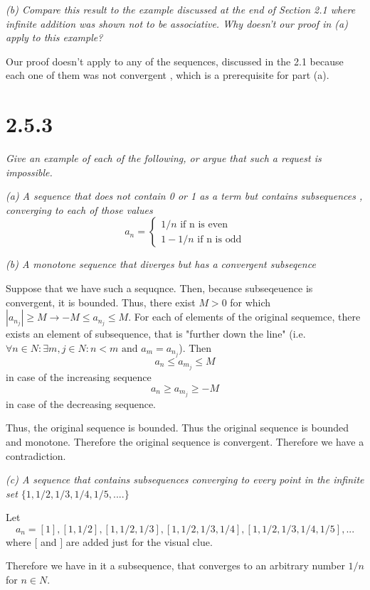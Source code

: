 \documentclass[11pt,oneside,titlepage]{article}
\begin{document}
\textit{(b) Compare this result to the example discussed at the end of Section
  2.1 where infinite addition was shown not to be associative. Why doesn't
  our proof in (a) apply to this example?}

Our proof doesn't apply to any of the sequences, discussed in the 2.1
because each one  of them was not convergent , which is a
prerequisite for part (a).

\section*{2.5.3}
\textit{Give an example of each of the following, or argue that such a request
  is impossible.}

\textit{(a) A sequence that does not contain 0 or 1 as a term but contains
  subsequences , converging to each of those values}
\begin{equation}
  a_n =
  \begin{cases}
    1/n \text{ if n is even} \\
    1 - 1/n \text{ if n is odd}
  \end{cases}
\end{equation}

\textit{(b) A monotone sequence that diverges but has a convergent subseqence}

Suppose that we have such a sequqnce. Then, because  subseqeuence is
convergent, it is bounded. Thus, there exist $M > 0$ for which
$ |a_{n_j}| \geq M \to -M \leq a_{n_j} \leq M$. For each of elements
of the original sequemce, there exists an element of subsequence,
that is "further down the line" (i.e.
$\forall n \in N: \exists m, j \in N: n < m \text{ and } a_m =
a_{n_j}$). Then
$$a_n \leq a_{m_j} \leq M$$
in case of the increasing sequence
$$a_n \geq a_{m_j} \geq -M$$
in case of the decreasing sequence.

Thus, the original sequence is bounded. Thus the original sequence is bounded
and monotone. Therefore the original sequence is convergent. Therefore
we have a contradiction.

\textit{(c) A sequence that contains subsequences converging to every point
  in the infinite set $\{1, 1/2, 1/3, 1/4, 1/5, ....\}$}

Let
$$a_n = [1], [1, 1/2], [1, 1/2, 1/3], [1, 1/2, 1/3, 1/4], [1, 1/2, 1/3, 1/4, 1/5], ...$$
where $[$ and $]$ are added just for the visual clue.

Therefore we have in it a subsequence, that converges to an arbitrary number
$1/n$ for $n \in N$.
\end{document}

